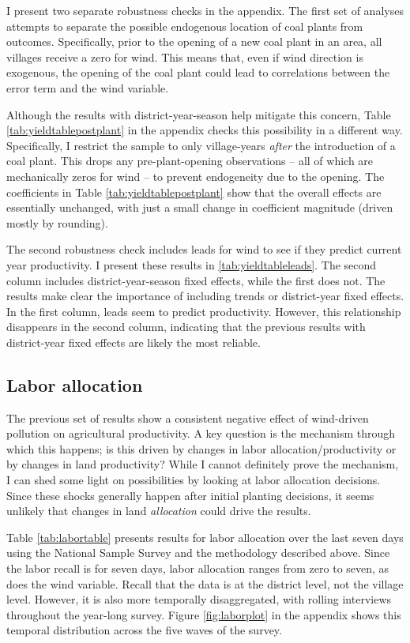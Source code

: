 \documentclass[
]{article}
\begin{document}
I present two separate robustness checks in the appendix. The first set of analyses attempts to separate the possible endogenous location of coal plants from outcomes. Specifically, prior to the opening of a new coal plant in an area, all villages receive a zero for wind. This means that, even if wind direction is exogenous, the opening of the coal plant could lead to correlations between the error term and the wind variable.

Although the results with district-year-season help mitigate this concern, Table \ref{tab:yieldtablepostplant} in the appendix checks this possibility in a different way. Specifically, I restrict the sample to only village-years \emph{after} the introduction of a coal plant. This drops any pre-plant-opening observations -- all of which are mechanically zeros for wind -- to prevent endogeneity due to the opening. The coefficients in Table \ref{tab:yieldtablepostplant} show that the overall effects are essentially unchanged, with just a small change in coefficient magnitude (driven mostly by rounding).

The second robustness check includes leads for wind to see if they predict current year productivity. I present these results in \ref{tab:yieldtableleads}. The second column includes district-year-season fixed effects, while the first does not. The results make clear the importance of including trends or district-year fixed effects. In the first column, leads seem to predict productivity. However, this relationship disappears in the second column, indicating that the previous results with district-year fixed effects are likely the most reliable.

\hypertarget{labor-allocation}{%
\subsection{Labor allocation}\label{labor-allocation}}

The previous set of results show a consistent negative effect of wind-driven pollution on agricultural productivity. A key question is the mechanism through which this happens; is this driven by changes in labor allocation/productivity or by changes in land productivity? While I cannot definitely prove the mechanism, I can shed some light on possibilities by looking at labor allocation decisions. Since these shocks generally happen after initial planting decisions, it seems unlikely that changes in land \emph{allocation} could drive the results.

Table \ref{tab:labortable} presents results for labor allocation over the last seven days using the National Sample Survey and the methodology described above. Since the labor recall is for seven days, labor allocation ranges from zero to seven, as does the wind variable. Recall that the data is at the district level, not the village level. However, it is also more temporally disaggregated, with rolling interviews throughout the year-long survey. Figure \ref{fig:laborplot} in the appendix shows this temporal distribution across the five waves of the survey.
\end{document}
